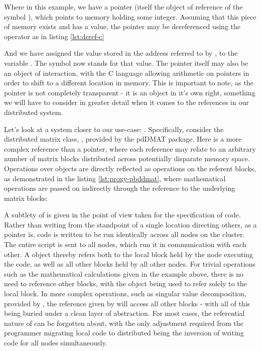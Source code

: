 
Where in this example, we have a pointer (itself the object of reference
of the symbol ), which points to memory holding some integer.
Assuming that this piece of memory exists and has a value, the pointer
may be dereferenced using the  operator as in listing \cref{lst:deref-c}


And we have assigned the value stored in the address referred to by
, to the variable . The symbol  now stands
for that value. The pointer itself may also be an object of interaction,
with the C language allowing arithmetic on pointers in order to shift to
a different location in memory. This is important to note, as the
pointer is not completely transparent - it is an object in it's own
right, something we will have to consider in greater detail when it
comes to the references in our distributed system.

Let's look at a system closer to our use-case: . Specifically,
consider the distributed matrix class, , provided by
the pdDMAT package. Here is a more complex reference than a pointer,
where each  reference may relate to an arbitrary number
of matrix blocks distributed across potentially disparate memory space.
Operations over  objects are directly reflected as
operations on the referent blocks, as demonstrated in the listing \cref{lst:proxy-pbddmat},
where mathematical operations are passed on indirectly through
the  reference to the underlying matrix blocks:


A subtlety of  is given in the point of view taken for the
specification of code. Rather than writing from the standpoint of a
single location directing others, as a pointer is,  code is written
to be run identically across all nodes on the cluster. The entire script
is sent to all nodes, which run it in communication with each other. A
 object thereby refers both to the local block held by
the node executing the code, as well as all other blocks held by all
other nodes. For trivial operations such as the mathematical
calculations given in the example above, there is no need to reference
other blocks, with the  object being used to refer
solely to the local block. In more complex operations, such as singular
value decomposition, provided by , the reference given by
 will access all other blocks - with all of this being
buried under a clean layer of abstraction. For most cases, the
referential nature of  can be forgotten about, with the
only adjustment required from the programmer migrating local code to
distributed being the inversion of writing code for all nodes
simultaneously.


